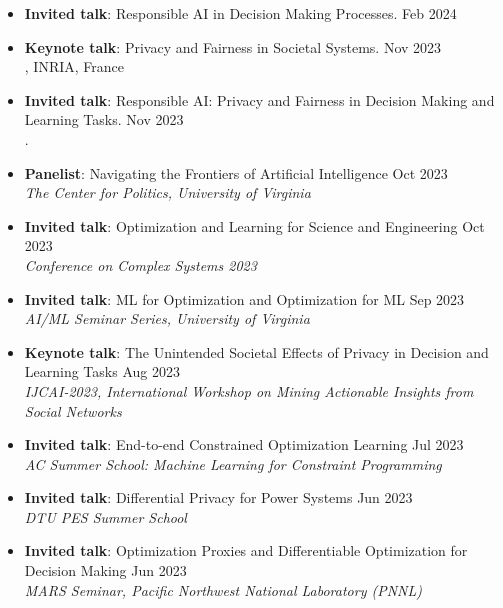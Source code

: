 \begin{itemize}
  \item {\bf Invited talk}: Responsible AI in Decision Making Processes. \hfill{Feb 2024}\\
  {}
  
  \item {\bf Keynote talk}: {Privacy and Fairness in Societal Systems.} \hfill{Nov 2023}\\
  {, INRIA, France}

  \item {\bf Invited talk}: {Responsible AI: Privacy and Fairness in Decision Making and Learning Tasks.} \hfill{Nov 2023}\\
  {.}

  \item {\bf Panelist}: {Navigating the Frontiers of Artificial Intelligence} \hfill{Oct 2023}\\
  {\em  The Center for Politics, University of Virginia}

  \item {\bf Invited talk}: {Optimization and Learning for Science and Engineering} \hfill{Oct 2023}\\
  {\em  Conference on Complex Systems 2023}

  \item {\bf Invited talk}: {ML for Optimization and Optimization for ML} \hfill{Sep 2023}\\
  {\em  AI/ML Seminar Series, University of Virginia}

  \item {\bf Keynote talk}: {The Unintended Societal Effects of Privacy in Decision and Learning Tasks} \hfill{Aug 2023}\\
  {\em  IJCAI-2023, International Workshop on Mining Actionable Insights from Social Networks}

  \item {\bf Invited talk}: {End-to-end Constrained Optimization Learning} \hfill{Jul 2023}\\
  {\em  AC Summer School: Machine Learning for Constraint Programming}

  \item {\bf Invited talk}: {Differential Privacy for Power Systems} \hfill{Jun 2023}\\
  {\em  DTU PES Summer School}

  \item {\bf Invited talk}: {Optimization Proxies and Differentiable Optimization for Decision Making} \hfill{Jun 2023}\\
  {\em  MARS Seminar, Pacific Northwest National Laboratory (PNNL)}


\end{itemize}
